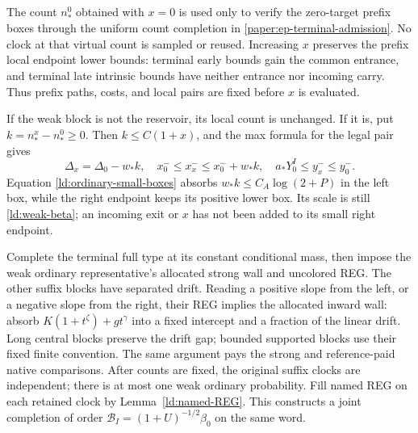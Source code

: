 The count \(n_*^0\) obtained with \(x=0\) is used only to verify
the zero-target prefix boxes through the uniform count completion
in \ref{paper:ep-terminal-admission}.  No clock at that virtual
count is sampled or reused.  Increasing \(x\) preserves the
prefix local endpoint lower bounds: terminal early bounds gain
the common entrance, and terminal late intrinsic bounds have
neither entrance nor incoming carry.  Thus prefix paths, costs,
and local pairs are fixed before \(x\) is evaluated.

If the weak block is not the reservoir, its local count is unchanged.
If it is, put \(k=n_*^x-n_*^0\ge0\).  Then \(k\le C(1+x)\),
and the max formula for the legal pair gives
\begin{equation}
 \Delta_x=\Delta_0-w_*k,\quad
 x_0^-\le x_x^-\le x_0^-+w_*k,\quad
 a_*Y_0^I\le y_x^-\le y_0^-.
 \label{ld:root-pair-change}
\end{equation}
Equation \eqref{ld:ordinary-small-boxes} absorbs
\(w_*k\le C_A\log(2+P)\) in the left box, while the right
endpoint keeps its positive lower box.  Its scale is still
\eqref{ld:weak-beta}; an incoming exit or \(x\) has not been
added to its small right endpoint.

Complete the terminal full type at its constant conditional mass,
then impose the weak ordinary representative's allocated strong wall
and uncolored REG.  The other suffix blocks have separated drift.
Reading a positive slope from the left, or a negative slope from
the right, their REG implies the allocated inward wall: absorb
\(K(1+t^\zeta)+gt^\gamma\) into a fixed intercept and a fraction
of the linear drift.  Long central blocks preserve the drift gap;
bounded supported blocks use their fixed finite convention.  The
same argument pays the strong and reference-paid native comparisons.
After counts are fixed, the original suffix clocks are independent;
there is at most one weak ordinary probability.  Fill named REG
on each retained clock by Lemma~\ref{ld:named-REG}.  This constructs
a joint completion of order
\(\mathcal B_I=(1+U)^{-1/2}\beta_0\) on the same word.

